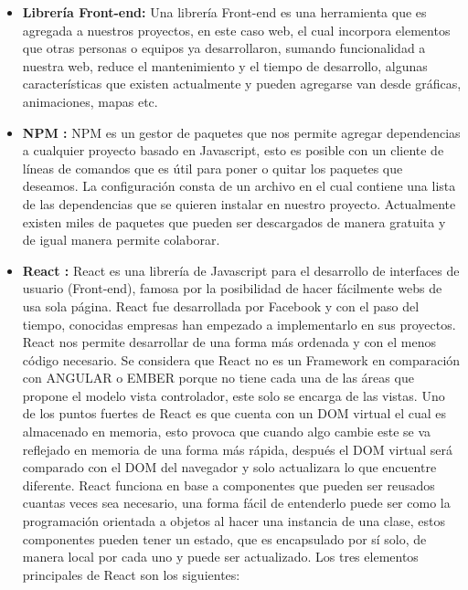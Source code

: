    \begin{itemize}
    
    	\item \textbf{Librería Front-end:} Una librería Front-end \cite{frontEnd2}es una herramienta que es agregada a nuestros proyectos, en este caso web, el cual incorpora elementos que otras personas o equipos ya desarrollaron, sumando funcionalidad a nuestra web, reduce el mantenimiento y el tiempo de desarrollo, algunas características que existen actualmente y pueden agregarse van desde gráficas, animaciones, mapas etc. 
      
       \item \textbf{NPM :} NPM \cite{npm} es un gestor de paquetes que nos permite agregar dependencias a cualquier proyecto basado en Javascript, esto es posible con un cliente de líneas de comandos que es útil para poner o quitar los paquetes que deseamos. La configuración consta de un archivo en el cual contiene una lista de las dependencias que se quieren instalar en nuestro proyecto. Actualmente existen miles de paquetes que pueden ser descargados de manera gratuita y de igual manera permite colaborar. 
       
       \item \textbf{ React :} React \cite{react} es una librería de Javascript para el desarrollo de interfaces de usuario (Front-end), famosa por la posibilidad de hacer fácilmente webs de usa sola página. React fue desarrollada por Facebook y con el paso del tiempo, conocidas empresas han empezado a implementarlo en sus proyectos. 
    React nos permite desarrollar de una forma más ordenada y con el menos código necesario. 
    Se considera que React no es un Framework en comparación con ANGULAR o EMBER porque no tiene cada una de las áreas que propone el modelo vista controlador, este solo se encarga de las vistas. 
    Uno de los puntos fuertes de React es que cuenta con un DOM virtual el cual es almacenado en memoria, esto provoca que cuando algo cambie este se va reflejado en memoria de una forma más rápida, después el DOM virtual será comparado con el DOM del navegador y solo actualizara lo que encuentre diferente. 
    React funciona en base a componentes que pueden ser reusados cuantas veces sea necesario, una forma fácil de entenderlo puede ser como la programación orientada a objetos al hacer una instancia de una clase, estos componentes pueden tener un estado, que es encapsulado por sí solo, de manera local por cada uno y puede ser actualizado.
    Los tres elementos principales de React son los siguientes:
 \begin{itemize}
 

\end{itemize}
\end{itemize}
